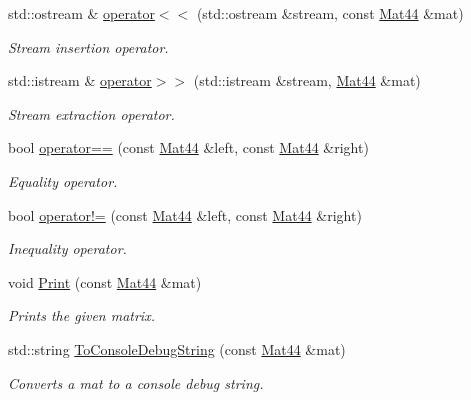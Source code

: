 \begin{DoxyCompactItemize}
\item 
std\+::ostream \& \hyperlink{structgfxmath_1_1_mat44_a189ebc68fceb04ac5cc0029589bff672}{operator$<$$<$} (std\+::ostream \&stream, const \hyperlink{structgfxmath_1_1_mat44}{Mat44} \&mat)
\begin{DoxyCompactList}\small\item\em Stream insertion operator. \end{DoxyCompactList}\item 
std\+::istream \& \hyperlink{structgfxmath_1_1_mat44_a9bf059f58f851c807cf2e5d207d0672a}{operator$>$$>$} (std\+::istream \&stream, \hyperlink{structgfxmath_1_1_mat44}{Mat44} \&mat)
\begin{DoxyCompactList}\small\item\em Stream extraction operator. \end{DoxyCompactList}\item 
bool \hyperlink{structgfxmath_1_1_mat44_af4dc2dcc368fc35c6fd456a0bb87f7a2}{operator==} (const \hyperlink{structgfxmath_1_1_mat44}{Mat44} \&left, const \hyperlink{structgfxmath_1_1_mat44}{Mat44} \&right)
\begin{DoxyCompactList}\small\item\em Equality operator. \end{DoxyCompactList}\item 
bool \hyperlink{structgfxmath_1_1_mat44_acbc1598a85e4db1071aa8b4f005ad422}{operator!=} (const \hyperlink{structgfxmath_1_1_mat44}{Mat44} \&left, const \hyperlink{structgfxmath_1_1_mat44}{Mat44} \&right)
\begin{DoxyCompactList}\small\item\em Inequality operator. \end{DoxyCompactList}\item 
void \hyperlink{structgfxmath_1_1_mat44_a29435fda8e5d65db573dadafee977651}{Print} (const \hyperlink{structgfxmath_1_1_mat44}{Mat44} \&mat)
\begin{DoxyCompactList}\small\item\em Prints the given matrix. \end{DoxyCompactList}\item 
std\+::string \hyperlink{structgfxmath_1_1_mat44_a5d850a4033c3297037241bf1c9ba6223}{To\+Console\+Debug\+String} (const \hyperlink{structgfxmath_1_1_mat44}{Mat44} \&mat)
\begin{DoxyCompactList}\small\item\em Converts a mat to a console debug string. \end{DoxyCompactList}\end{DoxyCompactItemize}
